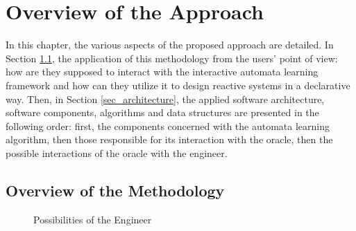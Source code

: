 \chapter{Overview of the Approach}
In this chapter, the various aspects of the proposed approach are detailed. In Section \ref{sec_methodology}, the application of this methodology from the users' point of view: how are they supposed to interact with the interactive automata learning framework and how can they utilize it to design reactive systems in a declarative way. Then, in Section \ref{sec_architecture}, the applied software architecture, software components, algorithms and data structures are presented in the following order: first, the components concerned with the automata learning algorithm, then those responsible for its interaction with the oracle, then the possible interactions of the oracle with the engineer.
\section{Overview of the Methodology} \label{sec_methodology}
\begin{figure}[!ht] 
	\centering
	\caption{Possibilities of the Engineer} %
	\label{fig_methodology_interactiontypes}
\end{figure}


